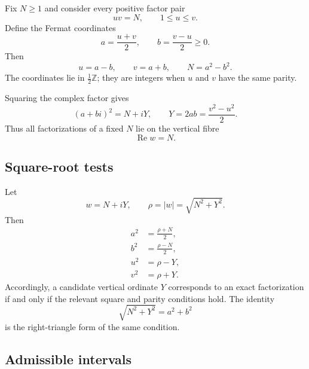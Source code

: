 \documentclass[11pt]{article}
\theoremstyle{definition}
\newcommand{\1}{\mathbf{1}}
\newcommand{\Z}{\mathbb{Z}}
\newcommand{\Repart}{\operatorname{Re}}
\begin{document}
Fix $N\ge1$ and consider every positive factor pair
\begin{equation}
 uv=N,
 \qquad
 1\le u\le v.
 \label{eq:factor-pair}
\end{equation}
Define the Fermat coordinates
\begin{equation}
 a=\frac{u+v}{2},
 \qquad
 b=\frac{v-u}{2}\ge0.
 \label{eq:full-Fermat}
\end{equation}
Then
\begin{equation}
 u=a-b,
 \qquad
 v=a+b,
 \qquad
 N=a^2-b^2.
 \label{eq:full-recovery}
\end{equation}
The coordinates lie in $\frac12\Z$; they are integers when $u$ and $v$ have the same parity.

Squaring the complex factor gives
\begin{equation}
 (a+bi)^2=N+iY,
 \qquad
 \boxed{Y=2ab=\frac{v^2-u^2}{2}.}
 \label{eq:full-square}
\end{equation}
Thus all factorizations of a fixed $N$ lie on the vertical fibre
\begin{equation}
 \Repart w=N.
 \label{eq:vertical-fibre}
\end{equation}

\subsection{Square-root tests}

Let
\begin{equation}
 w=N+iY,
 \qquad
 \rho=|w|=\sqrt{N^2+Y^2}.
 \label{eq:rho-full}
\end{equation}
Then
\begin{align}
 a^2&=\frac{\rho+N}{2},
 \label{eq:a-square}\\
 b^2&=\frac{\rho-N}{2},
 \label{eq:b-square}\\
 u^2&=\rho-Y,
 \label{eq:u-square}\\
 v^2&=\rho+Y.
 \label{eq:v-square}
\end{align}
Accordingly, a candidate vertical ordinate $Y$ corresponds to an exact factorization if and only if the relevant square and parity conditions hold.  The identity
\begin{equation}
 \sqrt{N^2+Y^2}=a^2+b^2
 \label{eq:hypotenuse}
\end{equation}
is the right-triangle form of the same condition.

\subsection{Admissible intervals}
\end{document}

